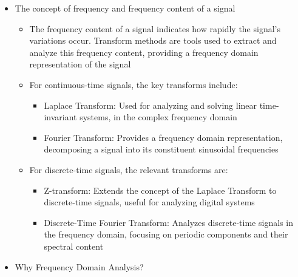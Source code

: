 \begin{itemize}
\begin{itemize}
    \end{itemize}

  \item The concept of frequency and frequency content of a signal

    \begin{itemize}

      \item The frequency content of a signal indicates how rapidly the signal's variations occur. Transform methods are tools used to extract and analyze this frequency content, providing a frequency domain representation of the signal

      \item For continuous-time signals, the key transforms include:

        \begin{itemize}

          \item Laplace Transform: Used for analyzing and solving linear time-invariant systems, in the complex frequency domain

          \item Fourier Transform: Provides a frequency domain representation, decomposing a signal into its constituent sinusoidal frequencies

        \end{itemize}

      \item For discrete-time signals, the relevant transforms are:

        \begin{itemize}

          \item Z-transform: Extends the concept of the Laplace Transform to discrete-time signals, useful for analyzing digital systems

          \item Discrete-Time Fourier Transform: Analyzes discrete-time signals in the frequency domain, focusing on periodic components and their spectral content

        \end{itemize}

    \end{itemize}

  \item Why Frequency Domain Analysis?

    \begin{enumerate}


\end{enumerate}
\end{itemize}
